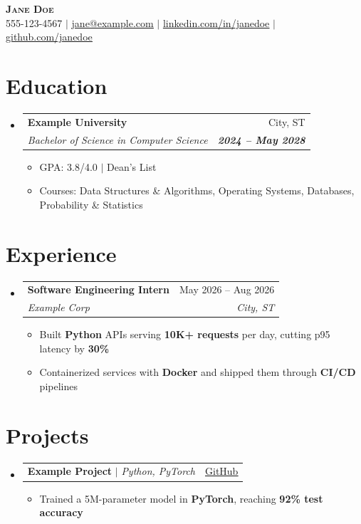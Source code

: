 \documentclass[letterpaper,11pt]{article}
\makeatletter
\newcommand{\resumeItem}[1]{
  \item\small{
    {#1 \vspace{-2pt}}
  }
}
\newcommand{\resumeSubheading}[4]{
  \vspace{-2pt}\item
    \begin{tabular*}{0.97\textwidth}[t]{l@{\extracolsep{\fill}}r}
      \textbf{#1} & #2 \\
      \textit{\small#3} & \textit{\small #4} \\
    \end{tabular*}\vspace{-7pt}
}
\newcommand{\resumeProjectHeading}[2]{
    \item
    \begin{tabular*}{0.97\textwidth}{l@{\extracolsep{\fill}}r}
      \small#1 & \small#2 \\
    \end{tabular*}\vspace{-7pt}
}
\newcommand{\resumeSubHeadingListStart}{\begin{itemize}[leftmargin=0.15in, label={}]}
\newcommand{\resumeSubHeadingListEnd}{\end{itemize}}
\newcommand{\resumeItemListStart}{\begin{itemize}[itemsep=1pt, parsep=0pt, topsep=2pt]}
\newcommand{\resumeItemListEnd}{\end{itemize}\vspace{-5pt}}
\makeatother
\begin{document}
\begin{center}
    \textbf{\Huge \scshape Jane Doe} \\ \vspace{1pt}
    \small 555-123-4567 $|$ \href{mailto:jane@example.com}{\underline{jane@example.com}} $|$
    \href{https://www.linkedin.com/in/janedoe}{\underline{linkedin.com/in/janedoe}} $|$
    \href{https://github.com/janedoe}{\underline{github.com/janedoe}}
\end{center}


\section{Education}
  \resumeSubHeadingListStart
    \resumeSubheading
      {Example University}{City, ST}
      {Bachelor of Science in Computer Science}{\textbf{2024 -- May 2028}}
      \resumeItemListStart
        \resumeItem{GPA: 3.8/4.0 $|$ Dean's List}
        \resumeItem{Courses: Data Structures \& Algorithms, Operating Systems, Databases, Probability \& Statistics}
      \resumeItemListEnd
  \resumeSubHeadingListEnd


\section{Experience}
  \resumeSubHeadingListStart

    \resumeSubheading
      {Software Engineering Intern}{May 2026 -- Aug 2026}
      {Example Corp}{City, ST}
      \resumeItemListStart
        \resumeItem{Built \textbf{Python} APIs serving \textbf{10K+ requests} per day, cutting p95 latency by \textbf{30\%}}
        \resumeItem{Containerized services with \textbf{Docker} and shipped them through \textbf{CI/CD} pipelines}
      \resumeItemListEnd

  \resumeSubHeadingListEnd


\section{Projects}
    \resumeSubHeadingListStart
      \resumeProjectHeading
          {\textbf{Example Project} $|$ \emph{Python, PyTorch}}{\href{https://github.com/janedoe/example}{\underline{GitHub}}}
          \resumeItemListStart
            \resumeItem{Trained a 5M-parameter model in \textbf{PyTorch}, reaching \textbf{92\% test accuracy}}
          \resumeItemListEnd
    \resumeSubHeadingListEnd
\end{document}
